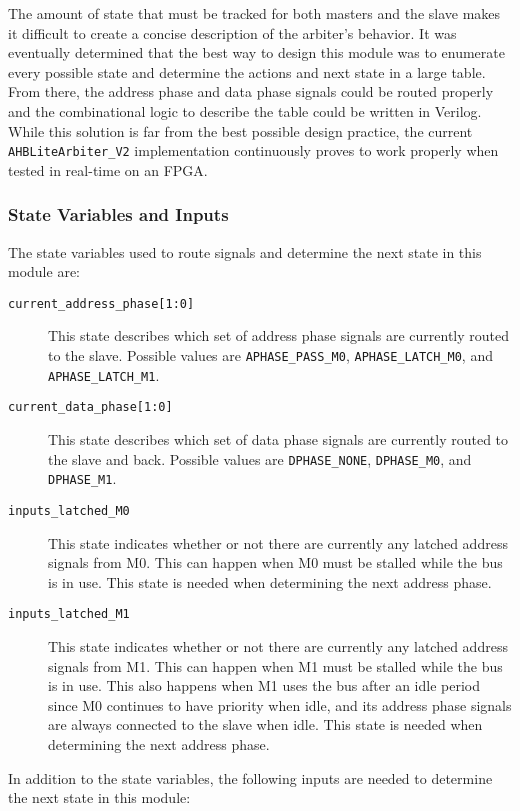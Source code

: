 The amount of state that must be tracked for both masters and the slave makes it difficult to create a concise description of the arbiter's behavior. It was eventually determined that the best way to design this module was to enumerate every possible state and determine the actions and next state in a large table. From there, the address phase and data phase signals could be routed properly and the combinational logic to describe the table could be written in Verilog. While this solution is far from the best possible design practice, the current \texttt{AHBLiteArbiter\_V2} implementation continuously proves to work properly when tested in real-time on an FPGA.

\subsubsection{State Variables and Inputs}
The state variables used to route signals and determine the next state in this module are:

\begin{description}
	\item[\texttt{current\_address\_phase[1:0]}] This state describes which set of address phase signals are currently routed to the slave. Possible values are \texttt{APHASE\_PASS\_M0}, \texttt{APHASE\_LATCH\_M0}, and \texttt{APHASE\_LATCH\_M1}.
	\item[\texttt{current\_data\_phase[1:0]}] This state describes which set of data phase signals are currently routed to the slave and back. Possible values are \texttt{DPHASE\_NONE}, \texttt{DPHASE\_M0}, and \texttt{DPHASE\_M1}.
	\item[\texttt{inputs\_latched\_M0}] This state indicates whether or not there are currently any latched address signals from M0. This can happen when M0 must be stalled while the bus is in use. This state is needed when determining the next address phase.
	\item[\texttt{inputs\_latched\_M1}] This state indicates whether or not there are currently any latched address signals from M1. This can happen when M1 must be stalled while the bus is in use. This also happens when M1 uses the bus after an idle period since M0 continues to have priority when idle, and its address phase signals are always connected to the slave when idle. This state is needed when determining the next address phase.
\end{description}

In addition to the state variables, the following inputs are needed to determine the next state in this module:

